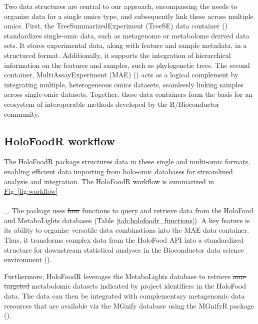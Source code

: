 \documentclass[unnumsec,webpdf,namedate,modern,large]{oup-authoring-template}%
\newcommand*{\figref}[2][]{%
  \hyperref[{fig:#2}]{%
    Fig~\ref*{fig:#2}%
    \ifx\\#1\\%
    \else
      \,#1%
    \fi
  }%
}
\providecommand{\DIFaddtex}[1]{{\protect\color{blue}\uwave{#1}}} %
\providecommand{\DIFdeltex}[1]{{\protect\color{red}\sout{#1}}}                      %
\providecommand{\DIFaddbegin}{} %
\providecommand{\DIFaddend}{} %
\providecommand{\DIFdelbegin}{} %
\providecommand{\DIFdelend}{} %
\providecommand{\DIFadd}[1]{\texorpdfstring{\DIFaddtex{#1}}{#1}} %
\providecommand{\DIFdel}[1]{\texorpdfstring{\DIFdeltex{#1}}{}} %
\newcommand{\DIFscaledelfig}{0.5}
\newlength{\DIFdelgraphicswidth} %
\newlength{\DIFdelgraphicsheight} %
\newcommand{\DIFaddincludegraphics}[2][]{{\color{blue}\fbox{\DIFOincludegraphics[#1]{#2}}}} %
\newcommand{\DIFdelincludegraphics}[2][]{%
\sbox{\DIFdelgraphicsbox}{\DIFOincludegraphics[#1]{#2}}%
\settoboxwidth{\DIFdelgraphicswidth}{\DIFdelgraphicsbox} %
\settoboxtotalheight{\DIFdelgraphicsheight}{\DIFdelgraphicsbox} %
\scalebox{\DIFscaledelfig}{%
\parbox[b]{\DIFdelgraphicswidth}{\usebox{\DIFdelgraphicsbox}\\[-\baselineskip] \rule{\DIFdelgraphicswidth}{0em}}\llap{\resizebox{\DIFdelgraphicswidth}{\DIFdelgraphicsheight}{%
\setlength{\unitlength}{\DIFdelgraphicswidth}%
\begin{picture}(1,1)%
\thicklines\linethickness{2pt} %
{\color[rgb]{1,0,0}\put(0,0){\framebox(1,1){}}}%
{\color[rgb]{1,0,0}\put(0,0){\line( 1,1){1}}}%
{\color[rgb]{1,0,0}\put(0,1){\line(1,-1){1}}}%
\end{picture}%
}\hspace*{3pt}}} %
} %
\DeclareRobustCommand{\DIFaddbegin}{\DIFOaddbegin \let\includegraphics\DIFaddincludegraphics} %
\DeclareRobustCommand{\DIFaddend}{\DIFOaddend \let\includegraphics\DIFOincludegraphics} %
\DeclareRobustCommand{\DIFdelbegin}{\DIFOdelbegin \let\includegraphics\DIFdelincludegraphics} %
\DeclareRobustCommand{\DIFdelend}{\DIFOaddend \let\includegraphics\DIFOincludegraphics} %
\begin{document}
Two data structures are central to our approach, encompassing the needs to organize data for a single omics type, and subsequently link these across multiple omics.
First, the TreeSummarizedExperiment (TreeSE) data container (\cite{huang_treesummarizedexperiment_2021}) standardizes single-omic data, such as metagenome or metabolome derived data sets. It stores experimental data, along with feature and sample metadata, in a structured format. Additionally, it supports the integration of hierarchical information on the features and samples, such as phylogenetic trees. The second container, MultiAssayExperiment (MAE) (\cite{ramos_software_2017}) acts as a logical complement by integrating multiple, heterogeneous omics datasets, seamlessly linking samples across single-omic datasets. Together, these data containers form the basis for an ecosystem of interoperable methods developed by the R/Bioconductor community.

\vspace{-1em}
\subsection{HoloFoodR workflow}

The HoloFoodR package structures data in these single and multi-omic formats, enabling efficient data importing from holo-omic databases for streamlined analysis and integration. The HoloFoodR workflow is summarized in \figref{workflow}. The package uses \DIFdelbegin \DIFdel{four }\DIFdelend \DIFaddbegin \DIFadd{six }\DIFaddend functions to query and retrieve data from the HoloFood and MetaboLights databases (Table \ref{tab:holofoodr_functions}). A key feature is its ability to organize versatile data combinations into the MAE data container. Thus, it transforms complex data from the HoloFood API into a standardized structure for downstream statistical analyses in the Bioconductor data science environment  (\cite{ramos_software_2017}).

Furthermore, HoloFoodR leverages the MetaboLights database to retrieve \DIFdelbegin \DIFdel{non-targeted }\DIFdelend metabolomic datasets indicated by project identifiers in the HoloFood data. The data can then be integrated with complementary metagenomic data resources that are available via the MGnify database using the MGnifyR package (\cite{mgnifyr}).

\vspace{-1em}
\end{document}
